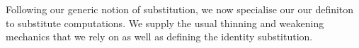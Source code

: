 Following our generic notion of substitution, we now specialise our
our definiton to substitute computations. We supply the usual thinning
and weakening mechanics that we rely on as well as defining the identity
substitution.

\begin{code}%
\>[0]\AgdaSpace{}%
\AgdaSymbol{:}\AgdaSpace{}%
\AgdaSpace{}%
\AgdaSpace{}%
\AgdaSpace{}%
\AgdaSpace{}%
\<%
\\
\>[0]\AgdaSpace{}%
\AgdaSpace{}%
\AgdaSpace{}%
\AgdaSymbol{=}\AgdaSpace{}%
\AgdaSpace{}%
\AgdaOperator{\AgdaFunction{⇒[}}\AgdaSpace{}%
\AgdaSpace{}%
\AgdaSpace{}%
\AgdaOperator{\AgdaFunction{]}}\AgdaSpace{}%
\<%
\\
%
\\[\AgdaEmptyExtraSkip]%
\>[0]%
\>[6]\AgdaSymbol{:}\AgdaSpace{}%
\AgdaSpace{}%
\AgdaSymbol{(}\AgdaSpace{}%
\AgdaSymbol{)}\<%
\\
\>[0]\AgdaOperator{\AgdaFunction{\AgdaUnderscore{}\textasciicircum{}}}%
\>[6]\AgdaSymbol{:}\AgdaSpace{}%
\AgdaSpace{}%
\AgdaSymbol{(}\AgdaSpace{}%
\AgdaSymbol{)}\<%
\\
\>[0]%
\>[6]\AgdaSymbol{:}\AgdaSpace{}%
\AgdaSpace{}%
\AgdaSpace{}%
\<%
\end{code}

